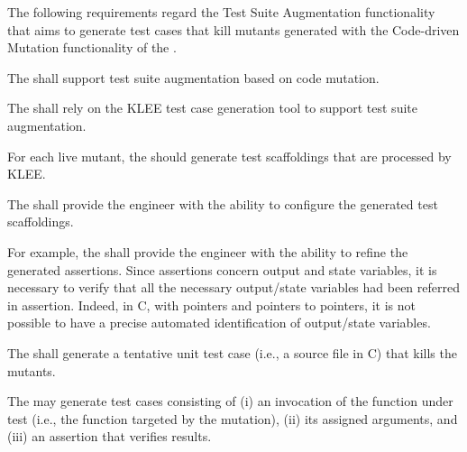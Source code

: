 The following requirements regard the Test Suite Augmentation functionality that aims to generate test cases that kill mutants generated with the Code-driven Mutation functionality of the \FAQAS.

\RQ{} The \FAQAS shall support test suite augmentation based on code mutation.

\RQ{} The \FAQAS shall rely on the KLEE test case generation tool to support test suite augmentation.

\RQ{} For each live mutant, the \FAQAS should generate test scaffoldings that are processed by KLEE.

\RQ{} The \FAQAS shall provide the engineer with the ability to configure the generated test scaffoldings.


\remark For example, the \FAQAS shall provide the engineer with the ability to refine the generated assertions. Since assertions concern output and state variables, it is necessary to verify that all the necessary output/state variables had been referred in assertion. Indeed, in C, with pointers and pointers to pointers, it is not possible to have a precise automated identification of output/state variables.

\RQ{} The \FAQAS shall generate a tentative unit test case (i.e., a source file in C) that kills the mutants.

\remark  The \FAQAS may generate test cases consisting of (i) an invocation of the function under test (i.e., the function targeted by the mutation), (ii) its assigned arguments, and (iii) an assertion that verifies results.

%
%
%
%
%
%


